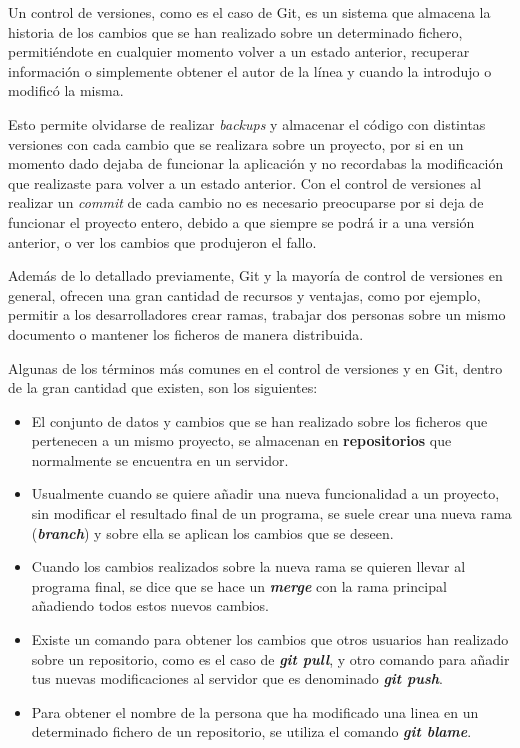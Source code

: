 \documentclass[a4paper, 12pt]{book}
\begin{document}
Un control de versiones, como es el caso de Git, es un sistema que almacena la historia de los cambios que se han realizado sobre un determinado fichero, permitiéndote en cualquier momento volver a un estado anterior, recuperar información o simplemente obtener el autor de la línea y cuando la introdujo o modificó la misma.

Esto permite olvidarse de realizar \textit{backups} y almacenar el código con distintas versiones con cada cambio que se realizara sobre un proyecto, por si en un momento dado dejaba de funcionar la aplicación y no recordabas la modificación que realizaste para volver a un estado anterior. Con el control de versiones al realizar un \textit{commit} de cada cambio no es necesario preocuparse por si deja de funcionar el proyecto entero, debido a que siempre se podrá ir a una versión anterior, o ver los cambios que produjeron el fallo.

Además de lo detallado previamente, Git y la mayoría de control de versiones en general, ofrecen una gran cantidad de recursos y ventajas, como por ejemplo, permitir a los desarrolladores crear ramas, trabajar dos personas sobre un mismo documento o mantener los ficheros de manera distribuida.

Algunas de los términos más comunes en el control de versiones y en Git, dentro de la gran cantidad que existen, son los siguientes:
\begin{itemize}
    \item El conjunto de datos y cambios que se han realizado sobre los ficheros que pertenecen a un mismo proyecto, se almacenan en \textbf{repositorios} que normalmente se encuentra en un servidor.
    \item Usualmente cuando se quiere añadir una nueva funcionalidad a un proyecto, sin modificar el resultado final de un programa, se suele crear una nueva rama (\textit{\textbf{branch}}) y sobre ella se aplican los cambios que se deseen.
    \item Cuando los cambios realizados sobre la nueva rama se quieren llevar al programa final, se dice que se hace un \textbf{\textit{merge}} con la rama principal añadiendo todos estos nuevos cambios.
    \item Existe un comando para obtener los cambios que otros usuarios han realizado sobre un repositorio, como es el caso de \textbf{\textit{git pull}}, y otro comando para añadir tus nuevas modificaciones al servidor que es denominado \textit{\textbf{git push}}.
    \item Para obtener el nombre de la persona que ha modificado una linea en un determinado fichero de un repositorio, se utiliza el comando \textbf{\textit{git blame}}.
\end{itemize}
\end{document}
